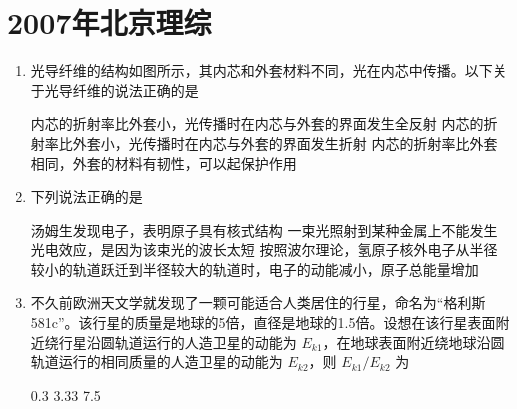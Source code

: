 \documentclass[\gkver]{gaokaozhenti}
\begin{document}
\chapter{2007年北京理综}

\begin{enumerate}
\item
光导纤维的结构如图所示，其内芯和外套材料不同，光在内芯中传播。以下关于光导纤维的说法正确的是

\onepicture[w=5.05cm]{}

{内芯的折射率比外套小，光传播时在内芯与外套的界面发生全反射}
{内芯的折射率比外套小，光传播时在内芯与外套的界面发生折射}
{内芯的折射率比外套相同，外套的材料有韧性，可以起保护作用}


\item
下列说法正确的是

{汤姆生发现电子，表明原子具有核式结构}
{一束光照射到某种金属上不能发生光电效应，是因为该束光的波长太短}
{按照波尔理论，氢原子核外电子从半径较小的轨道跃迁到半径较大的轨道时，电子的动能减小，原子总能量增加}


\item
不久前欧洲天文学就发现了一颗可能适合人类居住的行星，命名为“格利斯581c”。该行星的质量是地球的5倍，直径是地球的1.5倍。设想在该行星表面附近绕行星沿圆轨道运行的人造卫星的动能为 $E_{k1}$，在地球表面附近绕地球沿圆轨道运行的相同质量的人造卫星的动能为 $E_{k2}$，则 $E_{k1}/E_{k2}$ 为

{0.3}
{3.33}
{7.5}



\end{enumerate}
\end{document}
